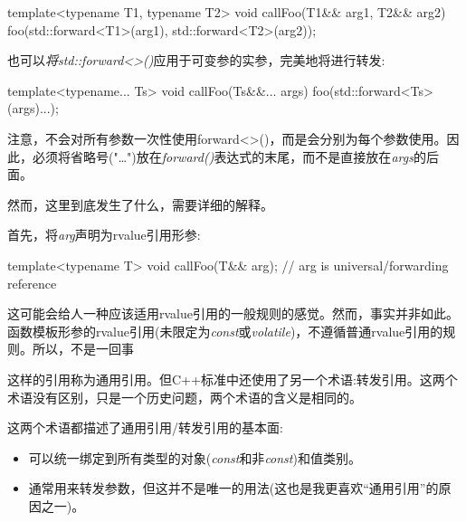 \begin{codebox}[cpp]
template<typename T1, typename T2>
void callFoo(T1&& arg1, T2&& arg2) {
  foo(std::forward<T1>(arg1), std::forward<T2>(arg2));
}
\end{codebox}

也可以\textit{将std::\allowbreak{}forward<\allowbreak{}>(\allowbreak{})\allowbreak{}}应用于可变参的实参，完美地将进行转发:\par

\begin{codebox}[cpp]
template<typename... Ts>
void callFoo(Ts&&... args) {
  foo(std::forward<Ts>(args)...);
}
\end{codebox}

注意，不会对所有参数一次性使用forward<>()，而是会分别为每个参数使用。因此，必须将省略号("…")放在\textit{forward()}表达式的末尾，而不是直接放在\textit{args}的后面。\par

然而，这里到底发生了什么，需要详细的解释。\par


首先，将\textit{arg}声明为rvalue引用形参:\par

\begin{codebox}[cpp]
template<typename T>
void callFoo(T&& arg); // arg is universal/forwarding reference
\end{codebox}

这可能会给人一种应该适用rvalue引用的一般规则的感觉。然而，事实并非如此。函数模板形参的rvalue引用(未限定为\textit{const}或\textit{volatile})，不遵循普通rvalue引用的规则。所以，不是一回事\par


这样的引用称为通用引用。但C++标准中还使用了另一个术语:转发引用。这两个术语没有区别，只是一个历史问题，两个术语的含义是相同的。\par

这两个术语都描述了通用引用/转发引用的基本面:\par

\begin{itemize}
  \item 可以统一绑定到所有类型的对象(\textit{const}和非\textit{const})和值类别。
  \item 通常用来转发参数，但这并不是唯一的用法(这也是我更喜欢“通用引用”的原因之一)。
\end{itemize}

